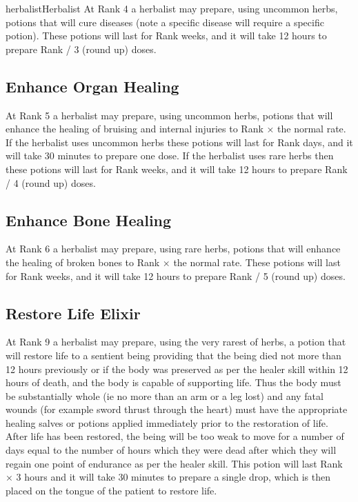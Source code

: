 \begin{Skill}[1.1]{herbalist}{Herbalist}
At Rank 4 a herbalist may prepare, using uncommon herbs, potions that
will cure diseases (note a specific disease will require a specific
potion).  These potions will last for Rank weeks, and it will take 12
hours to prepare Rank / 3 (round up) doses.

\subsection{Enhance Organ Healing}

At Rank 5 a herbalist may prepare, using uncommon herbs, potions that
will enhance the healing of bruising and internal injuries to Rank ×
the normal rate.  If the herbalist uses uncommon herbs these potions
will last for Rank days, and it will take 30 minutes to prepare one
dose.  If the herbalist uses rare herbs then these potions will last
for Rank weeks, and it will take 12 hours to prepare Rank / 4 (round
up) doses.

\subsection{Enhance Bone Healing}

At Rank 6 a herbalist may prepare, using rare herbs, potions that will
enhance the healing of broken bones to Rank × the normal rate.  These
potions will last for Rank weeks, and it will take 12 hours to prepare
Rank / 5 (round up) doses.

\subsection{Restore Life Elixir}

At Rank 9 a herbalist may prepare, using the very rarest of herbs, a
potion that will restore life to a sentient being providing that the
being died not more than 12 hours previously or if the body was
preserved as per the healer skill within 12 hours of death, and the
body is capable of supporting life.  Thus the body must be
substantially whole (ie no more than an arm or a leg lost) and any
fatal wounds (for example sword thrust through the heart) must have
the appropriate healing salves or potions applied immediately prior to
the restoration of life.  After life has been restored, the being will
be too weak to move for a number of days equal to the number of hours
which they were dead after which they will regain one point of
endurance as per the healer skill. This potion will last Rank × 3
hours and it will take 30 minutes to prepare a single drop, which is
then placed on the tongue of the patient to restore life.


\end{Skill}

